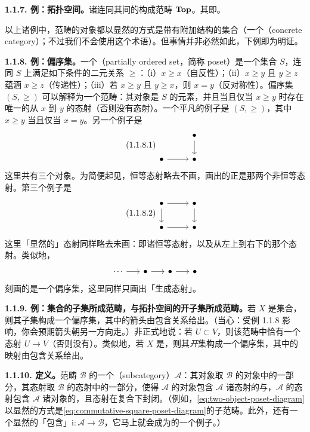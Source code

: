 \textbf{1.1.7. 例：拓扑空间。}\quad 诸\trTopologicalSpace{}连同其间的\trContinuousMap{}构成范畴 $\mathbf{Top}$。其\trIsomorphism{}即\trHomeomorphism。

以上诸例中，范畴的对象都以显然的方式是带有附加结构的集合（一个\textbf{\trConcreteCategory}（concrete category）；不过我们不会使用这个术语）。但事情并非必然如此，下例即为明证。

\textbf{1.1.8. 例：偏序集。}\quad 一个\textbf{\trPoset}（partially ordered set，简称 poset）是一个集合 $S$，连同 $S$ 上满足如下条件的二元关系 $\ge$：（i）$x\ge x$（自反性）；（ii）$x\ge y$ 且 $y\ge z$ 蕴涵 $x\ge z$（传递性）；（iii）若 $x\ge y$ 且 $y\ge x$，则 $x=y$（反对称性）。偏序集 $(S,\ge)$ 可以解释为一个范畴：其对象是 $S$ 的元素，并且当且仅当 $x\ge y$ 时存在唯一的从 $x$ 到 $y$ 的态射（否则没有态射）。一个平凡的例子是 $(S,\ge)$，其中 $x\ge y$ 当且仅当 $x=y$。另一个例子是
\begin{equation*}\tag{1.1.8.1}\label{eq:two-object-poset-diagram}
\begin{tikzcd}[row sep=1.7em, column sep=2.6em]
 & \bullet \ar[d] \\
\bullet \ar[r] & \bullet
\end{tikzcd}
\end{equation*}
这里共有三个对象。为简便起见，恒等态射略去不画，画出的正是那两个非恒等态射。第三个例子是
\begin{equation*}\tag{1.1.8.2}\label{eq:commutative-square-poset-diagram}
\begin{tikzcd}[row sep=1.7em, column sep=2.6em]
\bullet \ar[r] \ar[d] & \bullet \ar[d] \\
\bullet \ar[r] & \bullet
\end{tikzcd}
\end{equation*}
这里「显然的」态射同样略去未画：即诸恒等态射，以及从左上到右下的那个态射。类似地，
\[
\begin{tikzcd}[column sep=1.6em]
\cdots \ar[r] & \bullet \ar[r] & \bullet \ar[r] & \bullet
\end{tikzcd}
\]
刻画的是一个偏序集，这里同样只画出「生成态射」。

\textbf{1.1.9. 例：集合的子集所成范畴，与拓扑空间的开子集所成范畴。}\quad 若 $X$ 是集合，则其子集构成一个偏序集，其中的箭头由包含关系给出。（当心：受例 1.1.8 影响，你会预期箭头朝另一方向走。）非正式地说：若 $U\subset V$，则该范畴中恰有一个态射 $U\to V$（否则没有）。类似地，若 $X$ 是\trTopologicalSpace，则其\emph{开}集构成一个偏序集，其中的映射由包含关系给出。

\textbf{1.1.10. 定义。}\quad 范畴 $\mathscr{B}$ 的一个\textbf{\trSubcategory}（subcategory）$\mathscr{A}$：其对象取 $\mathscr{B}$ 的对象中的一部分，其态射取 $\mathscr{B}$ 的态射中的一部分，使得 $\mathscr{A}$ 的对象包含 $\mathscr{A}$ 诸态射的\trSource{}与\trTarget，$\mathscr{A}$ 的态射包含 $\mathscr{A}$ 诸对象的\trIdMorphism，且态射在复合下封闭。（例如，\eqref{eq:two-object-poset-diagram}以显然的方式是\eqref{eq:commutative-square-poset-diagram}的子范畴。此外，还有一个显然的「包含」$\mathrm{i}\colon\mathscr{A}\to\mathscr{B}$，它马上就会成为\trFunctor{}的一个例子。）

